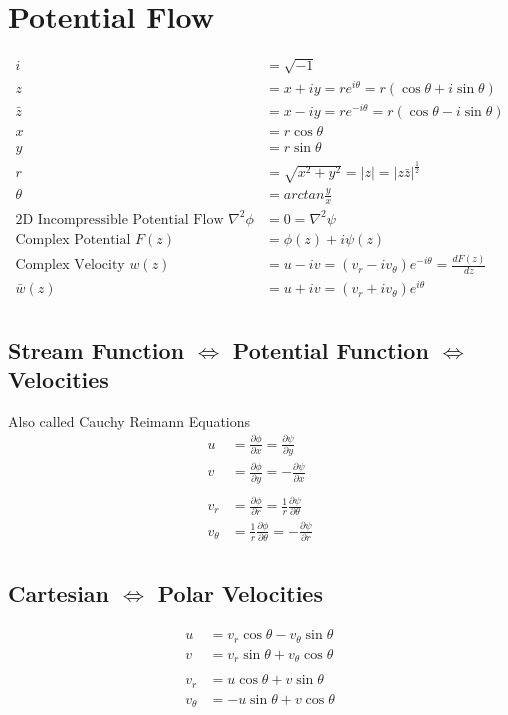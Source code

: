 \documentclass[11pt, letterpaper, notitlepage]{article}
\begin{document}
\section{Potential Flow}
\begin{align*}
i &= \sqrt{-1} \\
z &= x + i y = r e^{i \theta} = r (\cos{\theta} + i \sin{\theta}) \\
\bar{z} &= x - i y = r e^{-i \theta} = r (\cos{\theta} - i \sin{\theta}) \\
x &= r \cos{\theta} \\
y &= r \sin{\theta} \\
r &= \sqrt{x^2 + y^2} = |z| = |z \bar{z}|^{\frac{1}{2}} \\
\theta &= arctan{\frac{y}{x}} \\
\text{2D Incompressible Potential Flow } \nabla^2 \phi &= 0 = \nabla^2 \psi \\
\text{Complex Potential\ } F(z) &= \phi(z) + i \psi(z) \\
\text{Complex Velocity\ } w(z) &= u - i v = (v_r - i v_{\theta}) e^{-i \theta} = \frac{dF(z)}{dz} \\
\bar{w}(z) &= u + i v = (v_r + i v_{\theta}) e^{i \theta} \\
\end{align*}


\subsection{Stream Function $\Leftrightarrow$ Potential Function $\Leftrightarrow$ Velocities}
Also called Cauchy Reimann Equations
\begin{align*}
u &= \frac{\partial \phi}{\partial x} = \frac{\partial \psi}{\partial y} \\
v &= \frac{\partial \phi}{\partial y} = -\frac{\partial \psi}{\partial x} \\ \\
v_r &= \frac{\partial \phi}{\partial r} = \frac{1}{r} \frac{\partial \psi}{\partial \theta} \\
v_{\theta} &= \frac{1}{r} \frac{\partial \phi}{\partial \theta} = -\frac{\partial \psi}{\partial r} \\
\end{align*}

\subsection{Cartesian $\Leftrightarrow$ Polar Velocities}
\begin{align*}
u &= v_r \cos{\theta} - v_{\theta} \sin{\theta} \\
v &= v_r \sin{\theta} + v_{\theta} \cos{\theta} \\ \\
v_r &= u \cos{\theta} + v \sin{\theta} \\
v_{\theta} &= -u \sin{\theta} + v \cos{\theta} \\
\end{align*}
\end{document}
